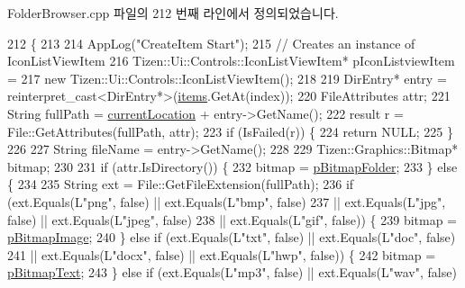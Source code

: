 Folder\+Browser.\+cpp 파일의 212 번째 라인에서 정의되었습니다.


\begin{DoxyCode}
212                                    \{
213 
214     AppLog(\textcolor{stringliteral}{"CreateItem Start"});
215     \textcolor{comment}{// Creates an instance of IconListViewItem}
216     Tizen::Ui::Controls::IconListViewItem* pIconListviewItem =
217             \textcolor{keyword}{new} Tizen::Ui::Controls::IconListViewItem();
218 
219     DirEntry* entry = \textcolor{keyword}{reinterpret\_cast<}DirEntry*\textcolor{keyword}{>}(\hyperlink{class_folder_browser_ae88620740bd179b78a573f1db28c50ba}{items}.GetAt(index));
220     FileAttributes attr;
221     String fullPath = \hyperlink{class_folder_browser_a1f7bc249da2f28c6a03759a983eacf75}{currentLocation} + entry->GetName();
222     result r = File::GetAttributes(fullPath, attr);
223     \textcolor{keywordflow}{if} (IsFailed(r)) \{
224         \textcolor{keywordflow}{return} NULL;
225     \}
226 
227     String fileName = entry->GetName();
228 
229     Tizen::Graphics::Bitmap* bitmap;
230 
231     \textcolor{keywordflow}{if} (attr.IsDirectory()) \{
232         bitmap = \hyperlink{class_folder_browser_a59c025c6956a8a9ef74395d12261a36e}{pBitmapFolder};
233     \} \textcolor{keywordflow}{else} \{
234 
235         String ext = File::GetFileExtension(fullPath);
236         \textcolor{keywordflow}{if} (ext.Equals(L\textcolor{stringliteral}{"png"}, \textcolor{keyword}{false}) || ext.Equals(L\textcolor{stringliteral}{"bmp"}, \textcolor{keyword}{false})
237                 || ext.Equals(L\textcolor{stringliteral}{"jpg"}, \textcolor{keyword}{false}) || ext.Equals(L\textcolor{stringliteral}{"jpeg"}, \textcolor{keyword}{false})
238                 || ext.Equals(L\textcolor{stringliteral}{"gif"}, \textcolor{keyword}{false})) \{
239             bitmap = \hyperlink{class_folder_browser_a4d40caed1664eca59bbf9e3da1cde15c}{pBitmapImage};
240         \} \textcolor{keywordflow}{else} \textcolor{keywordflow}{if} (ext.Equals(L\textcolor{stringliteral}{"txt"}, \textcolor{keyword}{false}) || ext.Equals(L\textcolor{stringliteral}{"doc"}, \textcolor{keyword}{false})
241                 || ext.Equals(L\textcolor{stringliteral}{"docx"}, \textcolor{keyword}{false}) || ext.Equals(L\textcolor{stringliteral}{"hwp"}, \textcolor{keyword}{false})) \{
242             bitmap = \hyperlink{class_folder_browser_ac204936172a6e66bcf444e2cd9ff7ec4}{pBitmapText};
243         \} \textcolor{keywordflow}{else} \textcolor{keywordflow}{if} (ext.Equals(L\textcolor{stringliteral}{"mp3"}, \textcolor{keyword}{false}) || ext.Equals(L\textcolor{stringliteral}{"wav"}, \textcolor{keyword}{false})

\end{DoxyCode}
